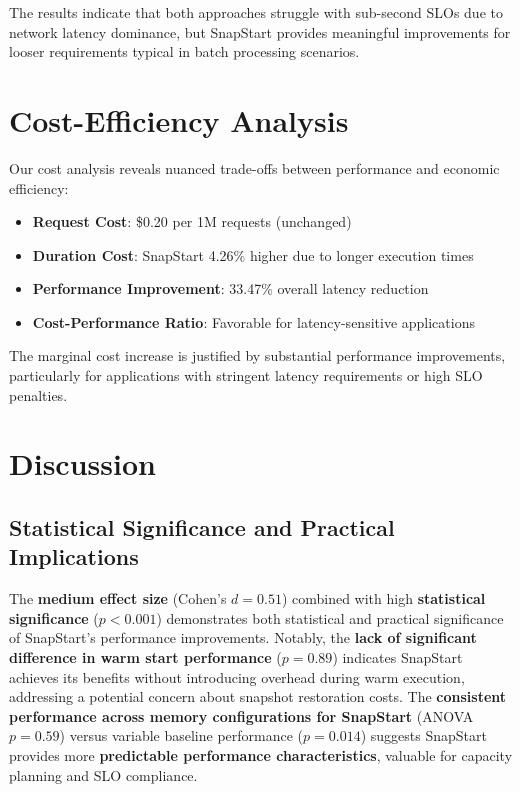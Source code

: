 \documentclass[conference]{IEEEtran}
\begin{document}
The results indicate that both approaches struggle with sub-second SLOs due to network latency dominance, but SnapStart provides meaningful improvements for looser requirements typical in batch processing scenarios.

\section{Cost-Efficiency Analysis}

Our cost analysis reveals nuanced trade-offs between performance and economic efficiency:

\begin{itemize}
\item \textbf{Request Cost}: \$0.20 per 1M requests (unchanged)
\item \textbf{Duration Cost}: SnapStart 4.26\% higher due to longer execution times
\item \textbf{Performance Improvement}: 33.47\% overall latency reduction
\item \textbf{Cost-Performance Ratio}: Favorable for latency-sensitive applications
\end{itemize}

The marginal cost increase is justified by substantial performance improvements, particularly for applications with stringent latency requirements or high SLO penalties.

\section{Discussion}

\subsection{Statistical Significance and Practical Implications}
The \textbf{medium effect size} (Cohen's $d = 0.51$) combined with high \textbf{statistical significance} ($p < 0.001$) demonstrates both statistical and practical significance of SnapStart's performance improvements. Notably, the \textbf{lack of significant difference in warm start performance} ($p = 0.89$) indicates SnapStart achieves its benefits without introducing overhead during warm execution, addressing a potential concern about snapshot restoration costs. The \textbf{consistent performance across memory configurations for SnapStart} (ANOVA $p = 0.59$) versus variable baseline performance ($p = 0.014$) suggests SnapStart provides more \textbf{predictable performance characteristics}, valuable for capacity planning and SLO compliance.
\end{document}
